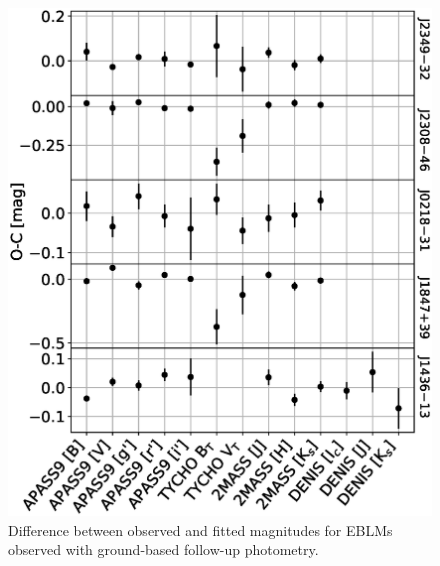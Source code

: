 \begin{figure}
    \centering
    \includegraphics[scale=0.5]{Appendix/SED_fits/SED_residuals_K2.eps}
    \caption{Difference between observed and fitted magnitudes for EBLMs observed with ground-based follow-up photometry.}
    \label{fig:SED_residuals_ground}
\end{figure}

